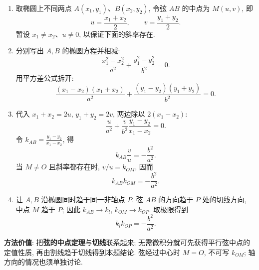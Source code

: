 \begin{proofbox}
\begin{enumerate}
  \item 取椭圆上不同两点 $A(x_1,y_1)$、$B(x_2,y_2)$,
  令弦 $AB$ 的中点为 $M(u,v)$, 即
  \[
  u=\frac{x_1+x_2}{2},\qquad v=\frac{y_1+y_2}{2}.
  \]
  暂设 $x_1\ne x_2$、$u\ne0$, 以保证下面的斜率存在.
  \item 分别写出 $A,B$ 的椭圆方程并相减:
  \[
  \frac{x_1^2-x_2^2}{a^2}
  +\frac{y_1^2-y_2^2}{b^2}=0.
  \]
  用平方差公式拆开:
  \[
  \frac{(x_1-x_2)(x_1+x_2)}{a^2}
  +\frac{(y_1-y_2)(y_1+y_2)}{b^2}=0.
  \]
  \item 代入 $x_1+x_2=2u$, $y_1+y_2=2v$, 两边除以
  $2(x_1-x_2)$:
  \[
  \frac{u}{a^2}
   +\frac{v}{b^2}\frac{y_1-y_2}{x_1-x_2}=0.
  \]
  令 $k_{AB}=\frac{y_1-y_2}{x_1-x_2}$, 得
  \[
  k_{AB}\frac vu=-\frac{b^2}{a^2}.
  \]
  当 $M\ne O$ 且斜率都存在时, $v/u=k_{OM}$, 因而
  \[
  \boxed{k_{AB}k_{OM}=-\frac{b^2}{a^2}.}
  \]
  \item 让 $A,B$ 沿椭圆同时趋于同一非轴点 $P$.
  弦 $AB$ 的方向趋于 $P$ 处的切线方向, 中点 $M$ 趋于 $P$;
  因此 $k_{AB}\to k_l$, $k_{OM}\to k_{OP}$.
  取极限得到
  \[
  \boxed{k_lk_{OP}=-\frac{b^2}{a^2}.}
  \]
\end{enumerate}
\textbf{方法价值}: 把\textbf{弦的中点定理}与\textbf{切线}联系起来;
无需微积分就可先获得平行弦中点的定值性质, 再由割线趋于切线得到本题结论.
弦经过中心时 $M=O$, 不可写 $k_{OM}$; 轴方向的情况也须单独讨论.
\end{proofbox}
